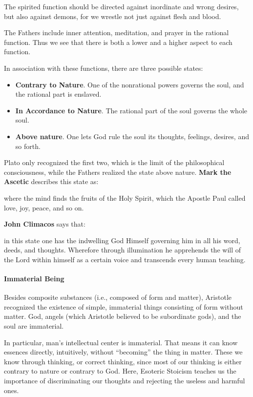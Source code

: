 The spirited function should be directed against inordinate and wrong desires, but also against demons, for we wrestle not just against flesh and blood.

The Fathers include inner attention, meditation, and prayer in the rational function. Thus we see that there is both a lower and a higher aspect to each function.

In association with these functions, there are three possible states:

\begin{itemize}
\item \textbf{Contrary to Nature}. One of the nonrational powers governs the soul, and the rational part is enslaved. 
\item \textbf{In Accordance to Nature}. The rational part of the soul governs the whole soul. 
\item \textbf{Above nature}. One lets God rule the soul its thoughts, feelings, desires, and so forth. 
\end{itemize}
Plato only recognized the first two, which is the limit of the philosophical consciousness, while the Fathers realized the state above nature. \textbf{Mark the Ascetic} describes this state as:

\begin{quotex}
where the mind finds the fruits of the Holy Spirit, which the Apostle Paul called love, joy, peace, and so on. 

\end{quotex}
\textbf{John Climacos} says that:

\begin{quotex}
in this state one has the indwelling God Himself governing him in all his word, deeds, and thoughts. Wherefore through illumination he apprehends the will of the Lord within himself as a certain voice and transcends every human teaching. 

\end{quotex}
\paragraph{Immaterial Being}
Besides composite substances (i.e., composed of form and matter), Aristotle recognized the existence of simple, immaterial things consisting of form without matter. God, angels (which Aristotle believed to be subordinate gods), and the soul are immaterial.

In particular, man's intellectual center is immaterial. That means it can know essences directly, intuitively, without “becoming” the thing in matter. These we know through thinking, or correct thinking, since most of our thinking is either contrary to nature or contrary to God. Here, Esoteric Stoicism teaches us the importance of discriminating our thoughts and rejecting the useless and harmful ones.

